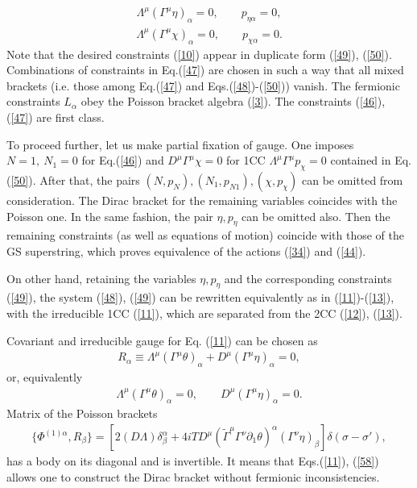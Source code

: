 \documentclass[a4paper]{article}
\begin{document}
\begin{eqnarray}\label{49}
\Lambda^\mu(\Gamma^\mu\eta)_\alpha=0, \qquad
p_{\eta\alpha}=0,
\end{eqnarray}
\begin{eqnarray}\label{50}
\Lambda^\mu(\Gamma^\mu\chi)_\alpha=0, \qquad
p_{\chi\alpha}=0.
\end{eqnarray}
Note that the desired constraints (\ref{10}) appear in duplicate form
(\ref{49}), (\ref{50}). Combinations of constraints in
Eq.(\ref{47}) are chosen in such a way that all mixed brackets
(i.e. those among Eq.(\ref{47}) and Eqs.(\ref{48})-(\ref{50})) vanish.
The fermionic constraints $L_\alpha$ obey the Poisson bracket algebra
(\ref{3}). The constraints (\ref{46}), (\ref{47}) are
first class. 

To proceed further, let us make partial fixation of gauge. One imposes
$N=1, ~ N_1=0$ for Eq.(\ref{46}) and $D^\mu\Gamma^\mu\chi=0$ for
1CC $\Lambda^\mu\Gamma^\mu p_\chi=0$ contained in Eq.(\ref{50}). After
that, the pairs $(N, p_N), (N_1, p_{N1}), (\chi, p_\chi)$ can be omitted
from consideration. The Dirac bracket for the remaining variables
coincides with the Poisson one. In the same fashion, the pair
$\eta, p_\eta$ can be omitted also. Then the remaining constraints (as
well as equations of motion) coincide with those of the GS superstring,
which proves equivalence of the actions (\ref{34}) and (\ref{44}).

On other hand, retaining the variables $\eta, p_\eta$ and the 
corresponding constraints (\ref{49}), the system
(\ref{48}), (\ref{49}) can be rewritten equivalently as in 
(\ref{11})-(\ref{13}), 
with the irreducible 1CC (\ref{11}), which are separated from the
2CC (\ref{12}), (\ref{13}).

Covariant and irreducible gauge for Eq. (\ref{11}) can be chosen as
\begin{eqnarray}\label{58}
R_\alpha\equiv\Lambda^\mu(\Gamma^\mu\theta)_\alpha+
D^\mu(\Gamma^\mu\eta)_\alpha=0,
\end{eqnarray}
or, equivalently
\begin{eqnarray}\label{59}
\Lambda^\mu(\Gamma^\mu\theta)_\alpha=0, \qquad
D^\mu(\Gamma^\mu\eta)_\alpha=0.
\end{eqnarray}
Matrix of the Poisson brackets
\begin{eqnarray}\label{60}
\{\Phi^{(1)\alpha}, R_\beta\}=[2(D\Lambda)\delta^\alpha_\beta+
4iTD^\mu(\tilde\Gamma^\mu\Gamma^\nu\partial_1\theta)^\alpha
(\Gamma^\nu\eta)_\beta]\delta(\sigma-\sigma '),
\end{eqnarray}
has a body on its diagonal and is invertible. It means that
Eqs.(\ref{11}), (\ref{58}) allows one to construct the Dirac bracket
without fermionic inconsistencies.
\end{document}
